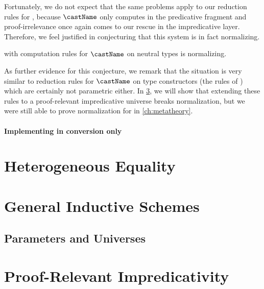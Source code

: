 Fortunately, we do not expect that the same problems apply to our reduction 
rules for \SetoidCCplus, because \( \castName \) only computes in the 
predicative fragment and proof-irrelevance once again comes to our rescue 
in the impredicative layer.
% 
Therefore, we feel justified in conjecturing that this system is in fact 
normalizing.
% 
\begin{conjecture}
  \SetoidCCplus with computation rules for \( \castName \) on neutral types is 
  normalizing.
\end{conjecture}

As further evidence for this conjecture, we remark that the situation is very 
similar to reduction rules for \( \castName \) on type constructors 
(\ie the rules of \SetoidCC) which are certainly not parametric either.
% 
In \cref{sec:proof-rel-impred}, we will show that extending these rules to a
proof-relevant impredicative universe breaks normalization, but we were still
able to prove normalization for \SetoidCC in \cref{ch:metatheory}. 

\paragraph{Implementing  in conversion only}



\section{Heterogeneous Equality}

\section{General Inductive Schemes}

\subsection{Parameters and Universes}

\section{Proof-Relevant Impredicativity}
\label{sec:proof-rel-impred}

